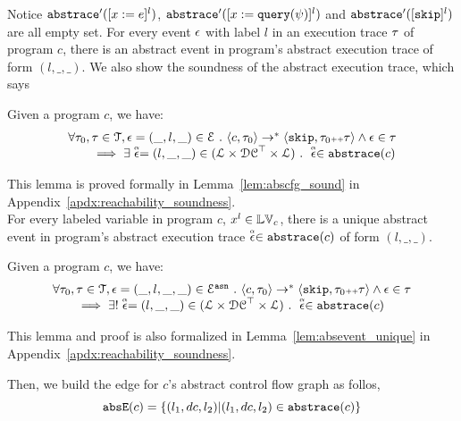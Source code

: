    Notice $\mathtt{abs}{\mathtt{trace}}'([x := e]^{l})$, $\mathtt{abs}{\mathtt{trace}}'([x := {\tt query}(\psi)]^{l})$ and $\mathtt{abs}{\mathtt{trace}}'([\mathtt{skip}]^{l})$ are all empty set. 
   For every event $\mathtt{\epsilon}$ with label $l$ in an execution trace $\mathtt{\tau}$ of program $c$, 
   there is an abstract event in program's abstract execution trace of form $(l, \_, \_)$.  We also show the soundness of the abstract execution trace, which says 
   \begin{lem}
     \label{lem:abscfg_sound}
   Given a program ${c}$, we have:
   \[
     \begin{array}{l}
       \forall \mathtt{\tau}_0, \mathtt{\tau} \in \mathcal{T} ,  \mathtt{\epsilon} = (\_, l, \_) \in \mathcal{E} ~.~
   \langle {c}, \mathtt{\tau}_0 \rangle \to^{*} \langle \mathtt{skip}, \mathtt{\tau}_0 {\scriptscriptstyle ++} \mathtt{\tau} \rangle 
   \land \mathtt{\epsilon} \in \mathtt{\tau} 
   \\
   \qquad \implies \exists \stackrel{\scriptscriptstyle{\alpha}}{\mathtt{\epsilon}{}} = (l, \_, \_) \in (\mathcal{L}\times \mathcal{DC}^{\top} \times \mathcal{L}) ~.~ 
   \stackrel{\scriptscriptstyle{\alpha}}{\mathtt{\epsilon}{}} \in \mathtt{abs}{\mathtt{trace}}(c)
   \end{array}
   \]
   \end{lem}
This lemma is proved formally in Lemma~\ref{lem:abscfg_sound} in Appendix~\ref{apdx:reachability_soundness}.
\\
For every labeled variable in program $c$, $x^l \in \mathbb{LV}_c$, there is a unique abstract event in program's abstract execution trace $\stackrel{\scriptscriptstyle{\alpha}}{\mathtt{\epsilon}{}} \in \mathtt{abs}{\mathtt{trace}}(c)$ of form $(l, \_, \_)$. 
\begin{lem}
  \label{lem:abscfg_unique}
Given a program ${c}$, we have:
%
\[
  \begin{array}{l}
    \forall \mathtt{\tau}_0, \mathtt{\tau} \in \mathcal{T} ,  \mathtt{\epsilon} = (\_, l, \_, \_) \in \mathcal{E}^{\mathtt{{asn}}} ~.~
\langle {c}, \mathtt{\tau}_0 \rangle \to^{*} \langle \mathtt{skip}, \mathtt{\tau}_0 {\scriptscriptstyle ++} \mathtt{\tau} \rangle 
\land \mathtt{\epsilon} \in \mathtt{\tau} 
\\
\qquad \implies \exists! \stackrel{\scriptscriptstyle{\alpha}}{\mathtt{\epsilon}{}} = (l, \_, \_) \in (\mathcal{L}\times \mathcal{DC}^{\top} \times \mathcal{L}) ~.~ 
\stackrel{\scriptscriptstyle{\alpha}}{\mathtt{\epsilon}{}} \in \mathtt{abs}{\mathtt{trace}}(c)
\end{array}
\]
\end{lem}
This lemma and proof is also 
formalized in Lemma~\ref{lem:absevent_unique} in Appendix~\ref{apdx:reachability_soundness}.

Then, we build the edge for $c$'s abstract control flow graph as follos,
\[
  \mathtt{abs}{\mathtt{E}}(c) = \{(l_1, dc, l_2) | (l_1, dc, l_2) \in \mathtt{abs}{\mathtt{trace}}(c)\}
  \]

